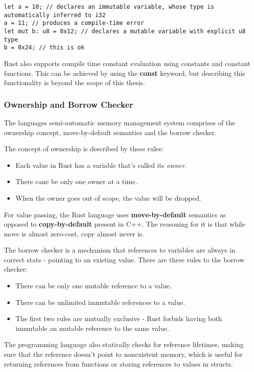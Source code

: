 \begin{lstlisting}
let a = 10; // declares an immutable variable, whose type is automatically inferred to i32
a = 11; // produces a compile-time error
let mut b: u8 = 0x12; // declares a mutable variable with explicit u8 type
b = 0x24; // this is ok
\end{lstlisting}

Rust also supports compile time constant evaluation using constants and constant functions.
This can be achieved by using the \textbf{const} keyword, but describing this functionality is beyond the scope of this thesis.

\subsubsection{Ownership and Borrow Checker}
The languages semi-automatic memory management system comprises of the ownership concept, move-by-default semantics and the borrow checker.

The concept of ownership is described by these rules\cite{rust_lang_book}:
\begin{itemize}
    \item Each value in Rust has a variable that's called its \textit{owner}.
    \item There cane be only one owner at a time.
    \item When the owner goes out of scope, the value will be dropped.
\end{itemize}
For value passing, the Rust language uses \textbf{move-by-default} semantics as opposed to \textbf{copy-by-default} present in C++.
The reasoning for it is that while move is almost zero-cost, copy almost never is.

The borrow checker is a mechanism that references to variables are always in correct state - pointing to an existing value.
There are three rules to the borrow checker:
\begin{itemize}
    \item There can be only one mutable reference to a value.
    \item There can be unlimited immutable references to a value.
    \item The first two rules are mutually exclusive - Rust forbids having both immutable an mutable reference to the same value.
\end{itemize}

The programming language also statically checks for reference lifetimes, making sure that the reference doesn't point to nonexistent memory, which is useful for returning references from functions or storing references to values in structs.

